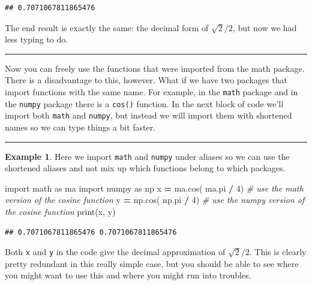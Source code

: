 \documentclass[
]{book}
\newenvironment{Shaded}{\begin{snugshade}}{\end{snugshade}}
\newcommand{\BuiltInTok}[1]{#1}
\newcommand{\CommentTok}[1]{\textcolor[rgb]{0.56,0.35,0.01}{\textit{#1}}}
\newcommand{\DecValTok}[1]{\textcolor[rgb]{0.00,0.00,0.81}{#1}}
\newcommand{\ImportTok}[1]{#1}
\newcommand{\NormalTok}[1]{#1}
\newcommand{\OperatorTok}[1]{\textcolor[rgb]{0.81,0.36,0.00}{\textbf{#1}}}
\theoremstyle{definition}
\theoremstyle{definition}
\newtheorem{example}{Example}[chapter]
\theoremstyle{definition}
\theoremstyle{remark}
\begin{document}
\begin{verbatim}
## 0.7071067811865476
\end{verbatim}

The end result is exactly the same: the decimal form of \(\sqrt{2}/2\), but now we had less typing to do.

\begin{center}\rule{0.5\linewidth}{0.5pt}\end{center}

Now you can freely use the functions that were imported from the math package. There is a disadvantage to this, however. What if we have two packages that import functions with the same name. For example, in the \texttt{math} package and in the \texttt{numpy} package there is a \texttt{cos()} function. In the next block of code we'll import both \texttt{math} and \texttt{numpy}, but instead we will import them with shortened names so we can type things a bit faster.

\begin{center}\rule{0.5\linewidth}{0.5pt}\end{center}

\begin{example}
\protect\hypertarget{exm:unnamed-chunk-703}{}{\label{exm:unnamed-chunk-703} }Here we import \texttt{math} and \texttt{numpy} under aliases so we can use the shortened aliases and not mix up which functions belong to which packages.
\end{example}

\begin{Shaded}
\begin{Highlighting}[]
\ImportTok{import}\NormalTok{ math }\ImportTok{as}\NormalTok{ ma}
\ImportTok{import}\NormalTok{ numpy }\ImportTok{as}\NormalTok{ np}
\NormalTok{x }\OperatorTok{=}\NormalTok{ ma.cos( ma.pi }\OperatorTok{/} \DecValTok{4}\NormalTok{) }\CommentTok{\# use the math version of the cosine function}
\NormalTok{y }\OperatorTok{=}\NormalTok{ np.cos( np.pi }\OperatorTok{/} \DecValTok{4}\NormalTok{) }\CommentTok{\# use the numpy version of the cosine function}
\BuiltInTok{print}\NormalTok{(x, y)}
\end{Highlighting}
\end{Shaded}

\begin{verbatim}
## 0.7071067811865476 0.7071067811865476
\end{verbatim}

Both \texttt{x} and \texttt{y} in the code give the decimal approximation of \(\sqrt{2}/2\). This is clearly pretty redundant in this really simple case, but you should be able to see where you might want to use this and where you might run into troubles.
\end{document}
